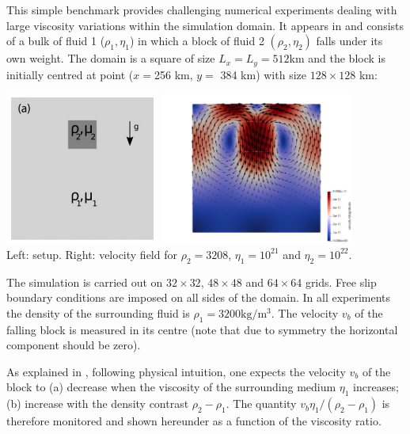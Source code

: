 This simple benchmark provides challenging numerical experiments 
dealing with large viscosity variations within the simulation
domain. It appears in \cite{gery10} and consists of a bulk of fluid 1 ($\rho_1,\eta_1$)
in which a block of fluid 2 $(\rho_2,\eta_2)$ falls under its own
weight. The domain is a square of size $L_x=L_y=512$km and the
block is initially centred at point ($x=$256 km, $y=$ 384 km) with size
$128\times 128$ km:

\begin{center}
\includegraphics[height=5cm]{python_codes/fieldstone_53/images/setup}
\includegraphics[height=5cm]{python_codes/fieldstone_53/images/vel}\\
{\small Left: setup. Right: velocity field for $\rho_2=3208$, $\eta_1=10^{21}$
and $\eta_2=10^{22}$.}
\end{center}

The simulation is carried out on $32\times32$, $48\times48$ and $64\times 64$ grids. Free slip
boundary conditions are imposed on all sides of the domain. 
In all experiments the density of the surrounding fluid is $\rho_1=3200\text{kg}/\text{m}^3$.
The velocity $v_b$ of the falling block is measured in its centre (note that due to symmetry 
the horizontal component should be zero).

As explained in \cite{thie11}, following physical intuition, one expects 
the velocity $v_b$ of the block to (a) decrease when the viscosity
of the surrounding medium $\eta_1$ increases; (b) increase with the
density contrast $\rho_2-\rho_1$. 
The quantity $v_b \eta_1/(\rho_2-\rho_1)$ is therefore monitored and shown hereunder as a function of 
the viscosity ratio.


